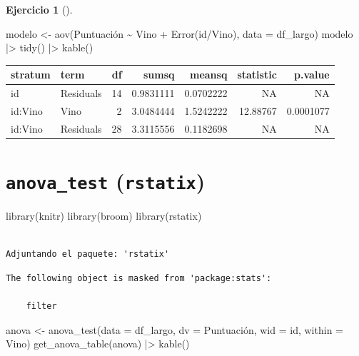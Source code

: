 \documentclass[
  a4paper,
]{scrreport}
\newenvironment{Shaded}{\begin{snugshade}}{\end{snugshade}}
\newcommand{\AttributeTok}[1]{\textcolor[rgb]{0.40,0.45,0.13}{#1}}
\newcommand{\FunctionTok}[1]{\textcolor[rgb]{0.28,0.35,0.67}{#1}}
\newcommand{\NormalTok}[1]{\textcolor[rgb]{0.00,0.23,0.31}{#1}}
\newcommand{\OtherTok}[1]{\textcolor[rgb]{0.00,0.23,0.31}{#1}}
\newcommand{\SpecialCharTok}[1]{\textcolor[rgb]{0.37,0.37,0.37}{#1}}
\theoremstyle{definition}
\newtheorem{exercise}{Ejercicio}[chapter]
\theoremstyle{remark}
\begin{document}
\begin{exercise}[]
\begin{enumerate}
\begin{tcolorbox}
\begin{Shaded}
\begin{Highlighting}[]
\NormalTok{modelo }\OtherTok{\textless{}{-}} \FunctionTok{aov}\NormalTok{(Puntuación }\SpecialCharTok{\textasciitilde{}}\NormalTok{ Vino }\SpecialCharTok{+} \FunctionTok{Error}\NormalTok{(id}\SpecialCharTok{/}\NormalTok{Vino), }\AttributeTok{data =}\NormalTok{ df\_largo) }
\NormalTok{modelo  }\SpecialCharTok{|\textgreater{}}  
    \FunctionTok{tidy}\NormalTok{() }\SpecialCharTok{|\textgreater{}} 
    \FunctionTok{kable}\NormalTok{()}
\end{Highlighting}
\end{Shaded}

  \begin{longtable}[]{@{}llrrrrr@{}}
  \toprule\noalign{}
  stratum & term & df & sumsq & meansq & statistic & p.value \\
  \midrule\noalign{}
  \endhead
  \bottomrule\noalign{}
  \endlastfoot
  id & Residuals & 14 & 0.9831111 & 0.0702222 & NA & NA \\
  id:Vino & Vino & 2 & 3.0484444 & 1.5242222 & 12.88767 & 0.0001077 \\
  id:Vino & Residuals & 28 & 3.3115556 & 0.1182698 & NA & NA \\
  \end{longtable}

  \section{\texorpdfstring{\texttt{anova\_test}
  (\texttt{rstatix})}{anova\_test (rstatix)}}

\begin{Shaded}
\begin{Highlighting}[]
\FunctionTok{library}\NormalTok{(knitr)}
\FunctionTok{library}\NormalTok{(broom)}
\FunctionTok{library}\NormalTok{(rstatix)}
\end{Highlighting}
\end{Shaded}

\begin{verbatim}

Adjuntando el paquete: 'rstatix'
\end{verbatim}

\begin{verbatim}
The following object is masked from 'package:stats':

    filter
\end{verbatim}

\begin{Shaded}
\begin{Highlighting}[]
\NormalTok{anova }\OtherTok{\textless{}{-}} \FunctionTok{anova\_test}\NormalTok{(}\AttributeTok{data =}\NormalTok{ df\_largo, }\AttributeTok{dv =}\NormalTok{ Puntuación, }\AttributeTok{wid =}\NormalTok{ id, }\AttributeTok{within =}\NormalTok{ Vino)}
\FunctionTok{get\_anova\_table}\NormalTok{(anova) }\SpecialCharTok{|\textgreater{}}
    \FunctionTok{kable}\NormalTok{()}
\end{Highlighting}
\end{Shaded}


\end{tcolorbox}
\end{enumerate}
\end{exercise}
\end{document}
